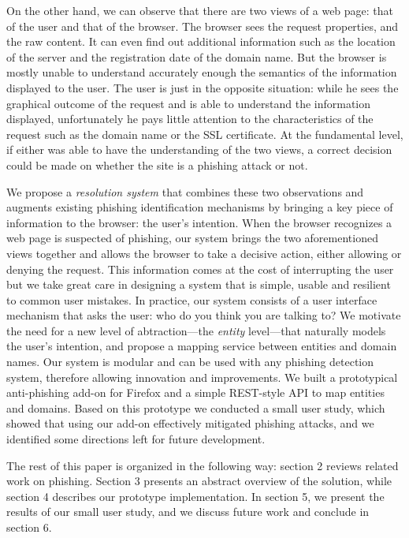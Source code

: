 \documentclass[11pt,styles/chicago]{article}
\begin{document}
On the other hand, we can observe that there are two views of a web page: that of the user and that of the browser. The browser sees the request properties, and the raw content. It can even find out additional information such as the location of the server and the registration date of the domain name. But the browser is mostly unable to understand accurately enough the semantics of the information displayed to the user. The user is just in the opposite situation: while he sees the graphical outcome of the request and is able to understand the information displayed, unfortunately he pays little attention to the characteristics of the request such as the domain name or the SSL certificate. At the fundamental level, if either was able to have the understanding of the two views, a correct decision could be made on whether the site is a phishing attack or not. %

We propose a \emph{resolution system} that combines these two observations and augments existing phishing identification mechanisms by bringing a key piece of information to the browser: the user's intention. When the browser recognizes a web page is suspected of phishing, our system brings the two aforementioned views together and allows the browser to take a decisive action, either allowing or denying the request. This information comes at the cost of interrupting the user but we take great care in designing a system that is simple, usable and resilient to common user mistakes. In practice, our system consists of a user interface mechanism that asks the user: who do you think you are talking to? We motivate the need for a new level of abtraction---the \emph{entity} level---that naturally models the user's intention, and propose a mapping service between entities and domain names. Our system is modular and can be used with any phishing detection system, therefore allowing innovation and improvements. We built a prototypical anti-phishing add-on for Firefox and a simple REST-style API to map entities and domains. Based on this prototype we conducted a small user study, which showed that using our add-on effectively mitigated phishing attacks, and we identified some directions left for future development.

The rest of this paper is organized in the following way: section 2 reviews related work on phishing. Section 3 presents an abstract overview of the solution, while section 4 describes our prototype implementation. In section 5, we present the results of our small user study, and we discuss future work and conclude in section 6.
\end{document}
